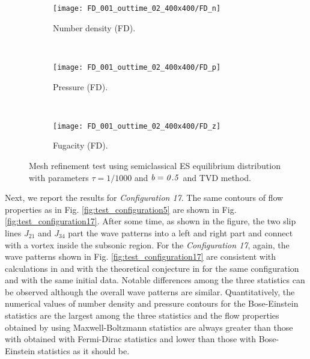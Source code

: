 \documentclass{rsproca}%
\begin{document}
\begin{figure}
\centering
	\begin{subfigure}[b]{0.32\textwidth}
                \centering
                \texttt{[image: FD\_001\_outtime\_02\_400x400/FD\_n]}
                \caption{Number density (FD).}
                \label{fig:5ESBGK_FD_n_400x400}
        \end{subfigure}
        ~ %
        \begin{subfigure}[b]{0.32\textwidth}
                \centering
                \texttt{[image: FD\_001\_outtime\_02\_400x400/FD\_p]}
                \caption{Pressure (FD).}
                \label{fig:5ESBGK_FD_p_400x400}
        \end{subfigure}
				~ %
        \begin{subfigure}[b]{0.32\textwidth}
                \centering
                \texttt{[image: FD\_001\_outtime\_02\_400x400/FD\_z]}
                \caption{Fugacity (FD).}
                \label{fig:5ESBGK_FD_z_400x400}
        \end{subfigure}
				\caption{Mesh refinement test using semiclassical ES equilibrium distribution with parameters $\tau = 1/1000$ and $\it{b=0.5}$ and TVD method.}
				\label{fig:FD_config5_400x400}
\end{figure}


Next, we report the results for \emph{Configuration 17}. The same contours of flow properties as in Fig. \ref{fig:test_configuration5} are shown in Fig. \ref{fig:test_configuration17}.  After some time, as shown in the figure, the two slip lines $J_{21}$ and $J_{34}$ part the wave patterns into a left and right part and connect with a vortex inside the subsonic region.
For the \emph{Configuration 17}, again, the wave patterns shown in Fig. \ref{fig:test_configuration17} are consistent with calculations in \cite{Laxliu95}\cite{schultzrinne} and  with the theoretical conjecture in \cite{ZhangZheng90} for the same configuration and with the same initial data.   Notable differences among the three statistics can be observed although the overall wave patterns are similar.  Quantitatively, the numerical values of number density and pressure contours for the Bose-Einstein statistics are the largest among the three statistics and the flow properties obtained by using Maxwell-Boltzmann statistics are always greater than those with obtained with Fermi-Dirac statistics and lower than those with Bose-Einstein statistics as it should be.
\end{document}
